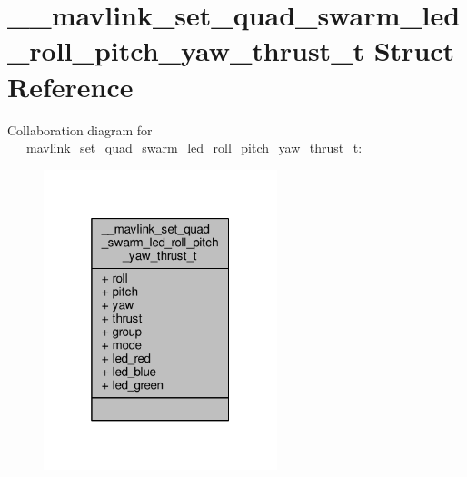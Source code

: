 \hypertarget{struct____mavlink__set__quad__swarm__led__roll__pitch__yaw__thrust__t}{\section{\+\_\+\+\_\+mavlink\+\_\+set\+\_\+quad\+\_\+swarm\+\_\+led\+\_\+roll\+\_\+pitch\+\_\+yaw\+\_\+thrust\+\_\+t Struct Reference}
\label{struct____mavlink__set__quad__swarm__led__roll__pitch__yaw__thrust__t}
}


Collaboration diagram for \+\_\+\+\_\+mavlink\+\_\+set\+\_\+quad\+\_\+swarm\+\_\+led\+\_\+roll\+\_\+pitch\+\_\+yaw\+\_\+thrust\+\_\+t\+:
\nopagebreak
\begin{figure}[H]
\begin{center}
\leavevmode
\includegraphics[width=193pt]{struct____mavlink__set__quad__swarm__led__roll__pitch__yaw__thrust__t__coll__graph}
\end{center}
\end{figure}
